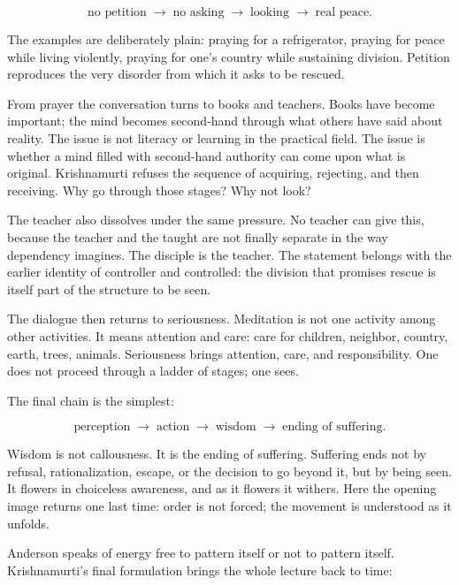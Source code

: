 \begin{equation}
\text{no petition}
\;\longrightarrow\;
\text{no asking}
\;\longrightarrow\;
\text{looking}
\;\longrightarrow\;
\text{real peace}.
\end{equation}

The examples are deliberately plain: praying for a refrigerator, praying for peace while living violently, praying for one's country while sustaining division. Petition reproduces the very disorder from which it asks to be rescued.

From prayer the conversation turns to books and teachers. Books have become important; the mind becomes second-hand through what others have said about reality. The issue is not literacy or learning in the practical field. The issue is whether a mind filled with second-hand authority can come upon what is original. Krishnamurti refuses the sequence of acquiring, rejecting, and then receiving. Why go through those stages? Why not look?

The teacher also dissolves under the same pressure. No teacher can give this, because the teacher and the taught are not finally separate in the way dependency imagines. The disciple is the teacher. The statement belongs with the earlier identity of controller and controlled: the division that promises rescue is itself part of the structure to be seen.

The dialogue then returns to seriousness. Meditation is not one activity among other activities. It means attention and care: care for children, neighbor, country, earth, trees, animals. Seriousness brings attention, care, and responsibility. One does not proceed through a ladder of stages; one sees.

The final chain is the simplest:

\begin{equation}
\text{perception}
\;\longrightarrow\;
\text{action}
\;\longrightarrow\;
\text{wisdom}
\;\longrightarrow\;
\text{ending of suffering}.
\end{equation}

Wisdom is not callousness. It is the ending of suffering. Suffering ends not by refusal, rationalization, escape, or the decision to go beyond it, but by being seen. It flowers in choiceless awareness, and as it flowers it withers. Here the opening image returns one last time: order is not forced; the movement is understood as it unfolds.

Anderson speaks of energy free to pattern itself or not to pattern itself. Krishnamurti's final formulation brings the whole lecture back to time:

